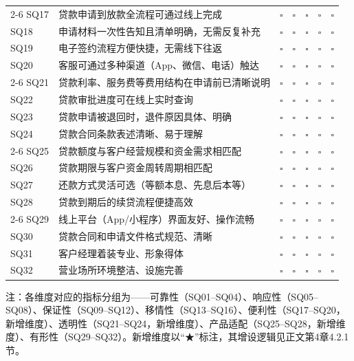 \begin{center}
\begin{tabularx}{\textwidth}{l X c c c c c}
  \cmidrule{2-6}
  SQ17 & 贷款申请到放款全流程可通过线上完成 & $\square$ & $\square$ & $\square$ & $\square$ & $\square$ \\
  SQ18 & 申请材料一次性告知且清单明确，无需反复补充 & $\square$ & $\square$ & $\square$ & $\square$ & $\square$ \\
  SQ19 & 电子签约流程方便快捷，无需线下往返 & $\square$ & $\square$ & $\square$ & $\square$ & $\square$ \\
  SQ20 & 客服可通过多种渠道（App、微信、电话）触达 & $\square$ & $\square$ & $\square$ & $\square$ & $\square$ \\
  \cmidrule{2-6}
  SQ21 & 贷款利率、服务费等费用结构在申请前已清晰说明 & $\square$ & $\square$ & $\square$ & $\square$ & $\square$ \\
  SQ22 & 贷款审批进度可在线上实时查询 & $\square$ & $\square$ & $\square$ & $\square$ & $\square$ \\
  SQ23 & 贷款申请被退回时，退件原因具体、明确 & $\square$ & $\square$ & $\square$ & $\square$ & $\square$ \\
  SQ24 & 贷款合同条款表述清晰、易于理解 & $\square$ & $\square$ & $\square$ & $\square$ & $\square$ \\
  \cmidrule{2-6}
  SQ25 & 贷款额度与客户经营规模和资金需求相匹配 & $\square$ & $\square$ & $\square$ & $\square$ & $\square$ \\
  SQ26 & 贷款期限与客户资金周转周期相匹配 & $\square$ & $\square$ & $\square$ & $\square$ & $\square$ \\
  SQ27 & 还款方式灵活可选（等额本息、先息后本等） & $\square$ & $\square$ & $\square$ & $\square$ & $\square$ \\
  SQ28 & 贷款到期后的续贷流程便捷高效 & $\square$ & $\square$ & $\square$ & $\square$ & $\square$ \\
  \cmidrule{2-6}
  SQ29 & 线上平台（App/小程序）界面友好、操作流畅 & $\square$ & $\square$ & $\square$ & $\square$ & $\square$ \\
  SQ30 & 贷款合同和申请文件格式规范、清晰 & $\square$ & $\square$ & $\square$ & $\square$ & $\square$ \\
  SQ31 & 客户经理着装专业、形象得体 & $\square$ & $\square$ & $\square$ & $\square$ & $\square$ \\
  SQ32 & 营业场所环境整洁、设施完善 & $\square$ & $\square$ & $\square$ & $\square$ & $\square$ \\
  \bottomrule
\end{tabularx}
\end{center}

\vspace{1em}
{\small 注：各维度对应的指标分组为——可靠性（SQ01--SQ04）、响应性（SQ05--SQ08）、保证性（SQ09--SQ12）、移情性（SQ13--SQ16）、便利性（SQ17--SQ20，新增维度）、透明性（SQ21--SQ24，新增维度）、产品适配（SQ25--SQ28，新增维度）、有形性（SQ29--SQ32）。新增维度以“★”标注，其增设逻辑见正文第4章4.2.1节。}

